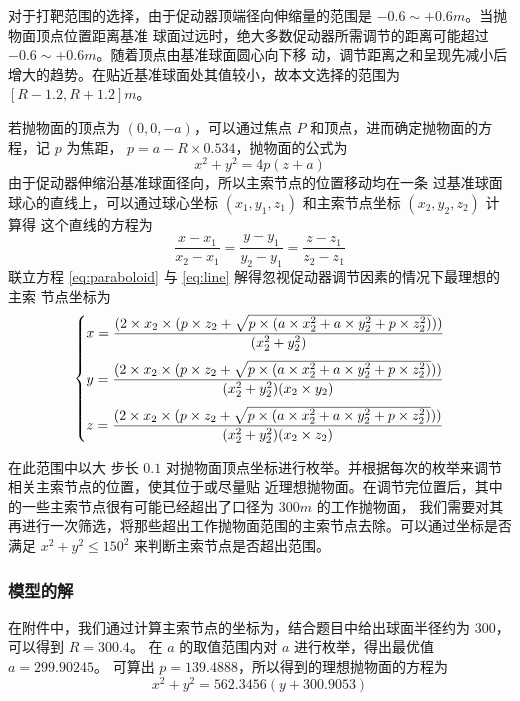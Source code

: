 \documentclass[withoutpreface,bwprint]{cumcmthesis} %
\begin{document}
对于打靶范围的选择，由于促动器顶端径向伸缩量的范围是 $-0.6\sim +0.6m$。当抛物面顶点位置距离基准
球面过远时，绝大多数促动器所需调节的距离可能超过 $-0.6\sim +0.6m$。随着顶点由基准球面圆心向下移
动，调节距离之和呈现先减小后增大的趋势。在贴近基准球面处其值较小，故本文选择的范围为$\left[R-1.2,
R+1.2\right]m$。

若抛物面的顶点为 $(0,0,-a)$，可以通过焦点 $P$ 和顶点，进而确定抛物面的方程，记 $p$ 为焦距，
$p = a-R \times 0.534$，抛物面的公式为
\begin{equation}
    \label{eq:paraboloid}
    x^2 + y^2 = 4p(z + a)
\end{equation}
由于促动器伸缩沿基准球面径向，所以主索节点的位置移动均在一条
过基准球面球心的直线上，可以通过球心坐标 $(x_1,y_1,z_1)$ 和主索节点坐标 $(x_2,y_2,z_2)$ 计算得
这个直线的方程为
\begin{equation}
    \label{eq:line}
    \frac{\displaystyle x - x_1}{\displaystyle x_2 - x_1} = \frac{\displaystyle y - y_1}
    {\displaystyle y_2 - y_1} = \frac{\displaystyle z - z_1}{\displaystyle z_2 - z_1}
\end{equation}
联立方程 \eqref{eq:paraboloid} 与 \eqref{eq:line} 解得忽视促动器调节因素的情况下最理想的主索
节点坐标为
\[
\begin{dcases}
    \smallskip
    x = \frac{(2\times x_2\times (p\times z_2 + \sqrt{p\times (a\times x_2^2 + a\times
    y_2^2 + p\times z_2^2)}))}{(x_2^2 + y_2^2)}  \\
    \smallskip
    y = \frac{(2\times x_2\times (p\times z_2 + \sqrt{p\times (a\times x_2^2 + a\times
    y_2^2 + p\times z_2^2)}))}{(x_2^2 + y_2^2)(x_2 \times y_2)}  \\
    z = \frac{(2\times x_2\times (p\times z_2 + \sqrt{p\times (a\times x_2^2 + a\times
    y_2^2 + p\times z_2^2)}))}{(x_2^2 + y_2^2)(x_2 \times z_2)}  \\
\end{dcases}
\]

在此范围中以大
步长 $0.1$ 对抛物面顶点坐标进行枚举。并根据每次的枚举来调节相关主索节点的位置，使其位于或尽量贴
近理想抛物面。在调节完位置后，其中的一些主索节点很有可能已经超出了口径为 $300m$ 的工作抛物面，
我们需要对其再进行一次筛选，将那些超出工作抛物面范围的主索节点去除。可以通过坐标是否满足
$x^2 + y^2 \leqslant 150^2$ 来判断主索节点是否超出范围。



\subsubsection{模型的解}
在附件中，我们通过计算主索节点的坐标为，结合题目中给出球面半径约为 $300$，可以得到 $R = 300.4$。
在 $a$ 的取值范围内对 $a$ 进行枚举，得出最优值 $a = 299.90245$。
可算出 $p = 139.4888$，所以得到的理想抛物面的方程为
\[
    x^2 + y^2 = 562.3456(y + 300.9053)
\]
\end{document}
